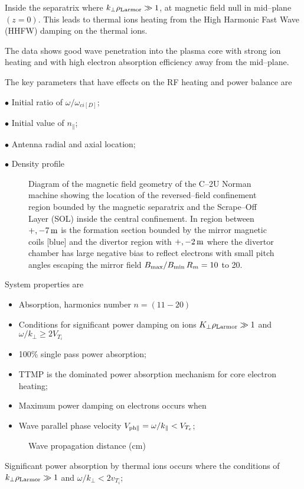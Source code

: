\documentclass[a4paper,openany,12pt]{book}
\begin{document}
Inside the separatrix where $k_\perp\rho_{\rm Larmor}\gg 1$, at magnetic field null in mid--plane 
$(z=0)$. This leads to thermal ions heating from the  High Harmonic Fast Wave (HHFW) damping on the thermal ions.

The data shows good wave penetration into the plasma core with strong ion heating and with high electron absorption efficiency away from the mid--plane. 

The key parameters that have effects on the RF heating and power balance are

$\bullet$ Initial ratio of $\omega/\omega_{ci[D]}$;

$\bullet$ Initial value of $n_\|$;

$\bullet$ Antenna radial and axial location;

$\bullet$ Density profile
%
\begin{figure}[H]
\centerline{}
\caption{Diagram of the magnetic field geometry of the C--2U Norman machine showing the location of the reversed--field confinement region bounded by the magnetic separatrix and the Scrape--Off Layer (SOL) inside the central confinement. In region between $+,- 7\,\rm m$ is the formation section bounded by the mirror magnetic coils [blue] and the divertor region with $+,-2\,\rm m$ where the divertor chamber has large negative bias to reflect electrons with small pitch angles escaping the mirror field $B_{\rm max}/B_{\rm min}\,R_m=10$ to 20.}
\label{F3.5}
\end{figure}
%
\noindent System properties are
\begin{itemize}
\item Absorption, harmonics number $n=(11-20)$
\item Conditions for significant power damping on ions $K_\perp\rho_{\rm Larmor}\gg 1$ and $\omega/k_\perp\ge 2V_{T_i}$
\item 100\% single pass power absorption;
\item TTMP is the dominated power absorption mechanism for core electron heating;
\item Maximum power damping on electrons occurs when 
\item Wave parallel phase velocity $V_{\rm  ph\|}=\omega/k_\|< V_{T_e}$;
\end{itemize}
%
\begin{figure}[H]
\centerline{}
\caption{Wave propagation distance (cm)}
\label{F3.6}
\end{figure}
%
Significant power absorption by thermal ions occurs where the conditions of $k_\perp\rho_{\rm Larmor}\gg 1$ and $\omega/k_\perp<2v_{T_i}$;
\end{document}
